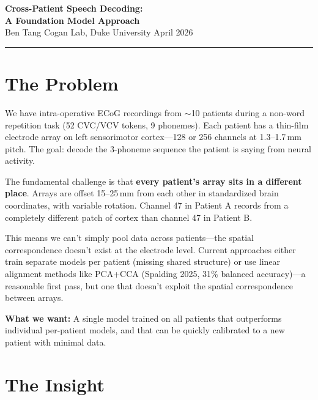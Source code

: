 \documentclass[11pt,letterpaper]{article}
\begin{document}
\begin{center}
{\LARGE\bfseries Cross-Patient Speech Decoding:\\[4pt]A Foundation Model Approach}\\[12pt]
{\normalsize Ben Tang \quad\textbar\quad Cogan Lab, Duke University \quad\textbar\quad April 2026}
\end{center}

\medskip\noindent\rule{\textwidth}{0.4pt}\medskip


\section{The Problem}

We have intra-operative \textmu ECoG recordings from ${\sim}$10 patients during a non-word repetition task (52 CVC/VCV tokens, 9 phonemes). Each patient has a thin-film electrode array on left sensorimotor cortex---128 or 256 channels at 1.3--1.7\,mm pitch. The goal: decode the 3-phoneme sequence the patient is saying from neural activity.

The fundamental challenge is that \textbf{every patient's array sits in a different place}. Arrays are offset 15--25\,mm from each other in standardized brain coordinates, with variable rotation. Channel 47 in Patient A records from a completely different patch of cortex than channel 47 in Patient B.

This means we can't simply pool data across patients---the spatial correspondence doesn't exist at the electrode level. Current approaches either train separate models per patient (missing shared structure) or use linear alignment methods like PCA+CCA (Spalding 2025, 31\% balanced accuracy)---a reasonable first pass, but one that doesn't exploit the spatial correspondence between arrays.

\textbf{What we want:} A single model trained on all patients that outperforms individual per-patient models, and that can be quickly calibrated to a new patient with minimal data.


\section{The Insight}
\end{document}
